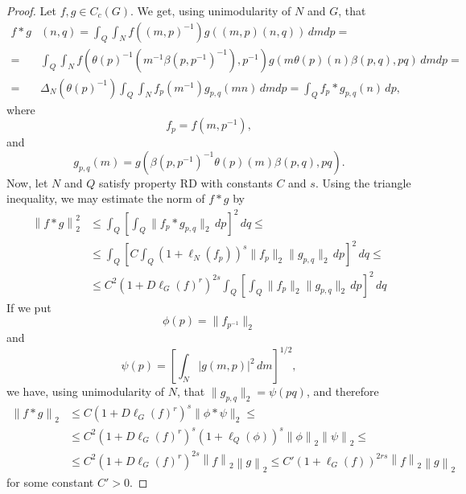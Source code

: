 \documentclass{amsart}
\theoremstyle{definition}
\theoremstyle{remark}
\begin{document}
\begin{proof}
  Let $f,g\in C_c(G)$. We get, using unimodularity of $N$ and $G$, that
  \begin{equation}
    \begin{split}
      f*g&(n,q) = \int_Q\int_N f((m,p)^{-1})g((m,p)(n,q))\,dmdp = \\
      = & \int_Q\int_N f(\theta(p)^{-1}(m^{-1}\beta(p,p^{-1})^{-1}),
      p^{-1}) g(m\theta(p)(n)\beta(p,q),pq)\,dmdp =\\
      = & \Delta_N(\theta(p)^{-1})\int_Q\int_N f_p(m^{-1})
      g_{p,q}(mn)\,dmdp = \int_Q f_p*g_{p,q}(n)\,dp,
    \end{split}
  \end{equation}
  where
  \begin{equation}
    f_p=f(m,p^{-1}),
  \end{equation}
  and
  \begin{equation}
    g_{p,q}(m) = g(\beta(p,p^{-1})^{-1}\theta(p)(m)\beta(p,q),pq).
  \end{equation}
  Now, let $N$ and $Q$ satisfy property RD with constants $C$ and
  $s$. Using the triangle inequality, we may estimate the norm of
  $f*g$ by
  \begin{equation}
    \begin{split}
      {\left\lVert{f*g}\right\rVert}_2^2 & \leq  \int_Q \left[ \int_Q \lVert f_p * g_{p,q}
        \rVert_2 \,dp \right]^2\, dq \leq \\ 
      & \leq  \int_Q\left[ C \int_Q (1 + \ell_N(f_p))^s\lVert f_p
        \rVert_2 \lVert g_{p,q} \rVert_2 \,dp\right]^2 \,dq \leq \\
      & \leq  C^2(1+D\ell_G(f)^r)^{2s} \int_Q \left[ \int_Q \lVert
        f_p\rVert_2 \lVert g_{p,q} \rVert_2\, dp\right]^2 \,dq
    \end{split}
  \end{equation}
  If we put
  \begin{equation}
    \phi(p) = \lVert{ f_{p^{-1}}}\rVert_2
  \end{equation}
  and
  \begin{equation}
    \psi(p) = \left[\int_N \lvert g(m,p)\rvert^2\,dm\right]^{1/2},
  \end{equation}
  we have, using unimodularity of $N$, that $\lVert g_{p,q}\rVert_2 =
  \psi(pq)$, and therefore
  \begin{equation}
    \begin{split}
      {\left\lVert{f*g}\right\rVert}_2 & \leq C(1+D\ell_G(f)^r)^{s}\lVert \phi * \psi
      \rVert_2 \leq \\
      & \leq
      C^2(1+D\ell_G(f)^r)^{s}(1+\ell_Q(\phi))^s{\left\lVert{\phi}\right\rVert}_2{\left\lVert{\psi}\right\rVert}_2
      \leq \\
      & \leq C^2 (1+D\ell_G(f)^r)^{2s}{\left\lVert{f}\right\rVert}_2{\left\lVert{g}\right\rVert}_2 \leq
      C'(1+\ell_G(f))^{2rs} {\left\lVert{f}\right\rVert}_2{\left\lVert{g}\right\rVert}_2
    \end{split}
  \end{equation}
  for some constant $C'>0$.
\end{proof}
\end{document}
